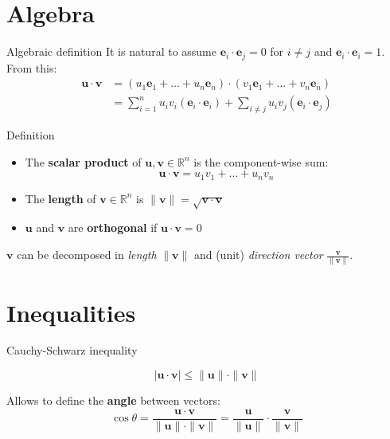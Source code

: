 \documentclass[10pt]{beamer}
\begin{document}
\section{Algebra}
\begin{frame}{Algebraic definition}
    It is natural to assume $\mathbf e_i \cdot \mathbf e_j = 0$ for $i \neq j$ and $\mathbf e_i \cdot \mathbf e_i = 1$. From this:
    \begin{align*}
    \mathbf u \cdot \mathbf v &= (u_1 \mathbf e_1 + \dots + u_n \mathbf e_n) \cdot (v_1 \mathbf e_1 + \dots + v_n \mathbf e_n) \\
    &= \sum\limits_{i=1}^n u_i v_i (\mathbf e_i \cdot \mathbf e_i) + \sum\limits_{i \neq j} u_i v_j (\mathbf e_i \cdot \mathbf e_j)
    \end{align*}

    \begin{block}{Definition}
    \begin{itemize}
        \item The \textbf{scalar product} of $\mathbf u, \mathbf v \in \mathbb R^n$ is the component-wise sum:
        $$\mathbf u \cdot \mathbf v = u_1 v_1 + \dots + u_n v_n$$
        \item The \textbf{length} of $\mathbf v \in \mathbb R^n$ is $\|\mathbf v\| = \sqrt{\mathbf v \cdot \mathbf v}$
        \item $\mathbf u$ and $\mathbf v$ are \textbf{orthogonal} if $\mathbf u \cdot \mathbf v = 0$
    \end{itemize}
    \end{block}
    $\mathbf v$ can be decomposed in \textit{length} $\|\mathbf v\|$ and (unit) \textit{direction vector} $\frac{\mathbf v}{\|\mathbf v\|}$.
\end{frame}

\section{Inequalities}
\begin{frame}{Cauchy-Schwarz inequality}
    \begin{center}
        
    \end{center}
    $$|\mathbf u \cdot \mathbf v| \leq \|\mathbf u\| \cdot \|\mathbf v \|$$

    Allows to define the \textbf{angle} between vectors: $$\cos \theta = \frac{\mathbf u \cdot \mathbf v}{\|\mathbf u\| \cdot \|\mathbf v\|} = \frac{\mathbf u}{\|\mathbf u\|} \cdot \frac{\mathbf v}{\|\mathbf v\|}$$
\end{frame}
\end{document}
